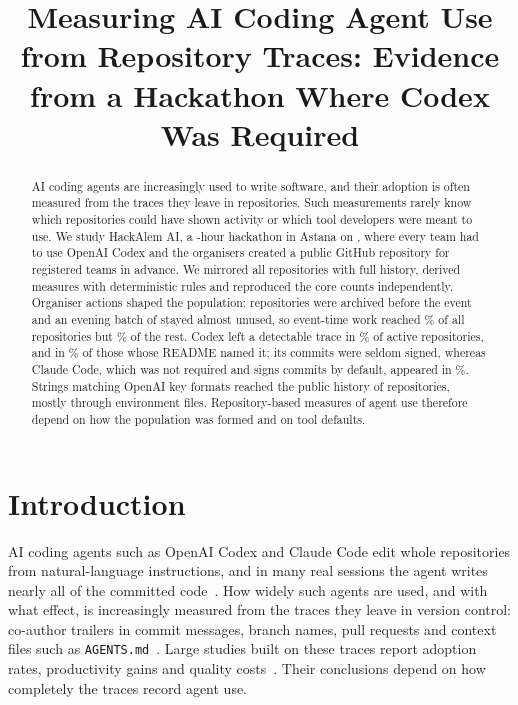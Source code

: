 \documentclass{article}
\title{Measuring AI Coding Agent Use from Repository Traces: Evidence from a Hackathon Where Codex Was Required}
\date{\versiondate}
\author{\authorblock}
\begin{document}
\maketitle

\begin{abstract}
AI coding agents are increasingly used to write software, and their adoption is often measured from the traces they leave in repositories. Such measurements rarely know which repositories could have shown activity or which tool developers were meant to use. We study HackAlem AI, a \eventhours-hour hackathon in Astana on \eventdate, where every team had to use OpenAI Codex and the organisers created a public GitHub repository for registered teams in advance. We mirrored all \NRqOneTotal{} repositories with full history, derived measures with deterministic rules and reproduced the core counts independently. Organiser actions shaped the population: \NRqOnePrearchivedN{} repositories were archived before the event and an evening batch of \NRqOneBatchN{} stayed almost unused, so event-time work reached \NRqOneActivePct\% of all repositories but \NRqOneActiveOfOpenNonbatchPct\% of the rest. Codex left a detectable trace in \NRqTwoTracesCodexAnyPct\% of active repositories, and in \NRqTwoTracesSelfReportCodexTraceGivenMentionPct\% of those whose README named it; its commits were seldom signed, whereas Claude Code, which was not required and signs commits by default, appeared in \NRqTwoTracesClaudeAnyPct\%. Strings matching OpenAI key formats reached the public history of \NRqFourOpenaiN{} repositories, mostly through environment files. Repository-based measures of agent use therefore depend on how the population was formed and on tool defaults.
\end{abstract}

\section{Introduction}\label{sec:intro}

AI coding agents such as OpenAI Codex and Claude Code edit whole repositories from natural-language instructions, and in many real sessions the agent writes nearly all of the committed code~\cite{baumann2026swechat}. How widely such agents are used, and with what effect, is increasingly measured from the traces they leave in version control: co-author trailers in commit messages, branch names, pull requests and context files such as \texttt{AGENTS.md}~\cite{li2025aidev,robbes2026agenticmuch,robbes2026heuristics,chatlatanagulchai2025agentreadmes}. Large studies built on these traces report adoption rates, productivity gains and quality costs~\cite{robbes2026agenticmuch,agarwal2026aiides,he2026cursor}. Their conclusions depend on how completely the traces record agent use.
\end{document}
